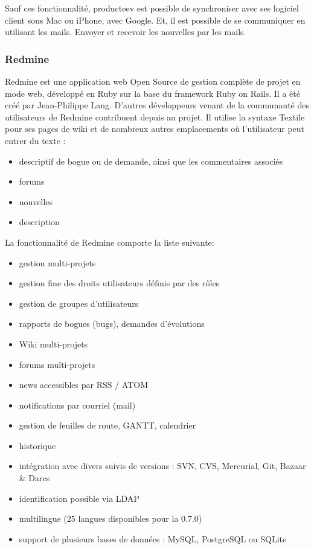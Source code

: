 Sauf ces fonctionnalité, producteev est possible de synchroniser avec ses logiciel client sous Mac ou iPhone, avec Google. Et, il est possible de se communiquer en utilisant les mails. Envoyer et recevoir les nouvelles par les mails. 


\subsubsection{Redmine} %
\label{ssub:redmine}


Redmine est une application web Open Source de gestion complète de projet en mode web, développé en Ruby sur la base du framework Ruby on Rails.
Il a été créé par Jean-Philippe Lang. D'autres développeurs venant de la communauté des utilisateurs de Redmine contribuent depuis au projet. Il utilise la syntaxe Textile pour ses pages de wiki et de nombreux autres emplacements où l'utilisateur peut entrer du texte : 
\begin{itemize}
	\item descriptif de bogue ou de demande, ainsi que les commentaires associés
	\item forums
	\item nouvelles
	\item description
\end{itemize}

La fonctionnalité de Redmine comporte la liste suivante:
\begin{itemize}
	\item gestion multi-projets
	\item gestion fine des droits utilisateurs définis par des rôles
	\item gestion de groupes d'utilisateurs
	\item rapports de bogues (bugs), demandes d'évolutions
	\item Wiki multi-projets
	\item forums multi-projets
	\item news accessibles par RSS / ATOM
	\item notifications par courriel (mail)
	\item gestion de feuilles de route, GANTT, calendrier
	\item historique
	\item intégration avec divers suivis de versions : SVN, CVS, Mercurial, Git, Bazaar \& Darcs
	\item identification possible via LDAP
	\item multilingue (25 langues disponibles pour la 0.7.0)
	\item support de plusieurs bases de données : MySQL, PostgreSQL ou SQLite
\end{itemize}


